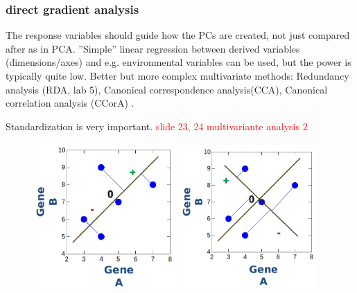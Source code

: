 \documentclass{article}
\begin{document}
\subsubsection{direct gradient analysis}
The response variables should guide how the PCs are created, not just compared after as in PCA. ”Simple” linear regression between derived variables (dimensions/axes) and e.g. environmental variables can be used, but the power is typically quite low. Better but more complex multivariate methods: Redundancy analysis (RDA, lab 5), Canonical correspondence analysis(CCA), Canonical correlation analysis (CCorA) .\par
Standardization is very important.
\textcolor{red}{slide 23, 24 multivariante analysis 2}\par 

\begin{figure}[h]
    \centering
    \includegraphics[width = 0.49\textwidth]{PCA/1PC.png}
    \includegraphics[width = 0.46\textwidth]{PCA/2PC.png}
\end{figure}
\end{document}
